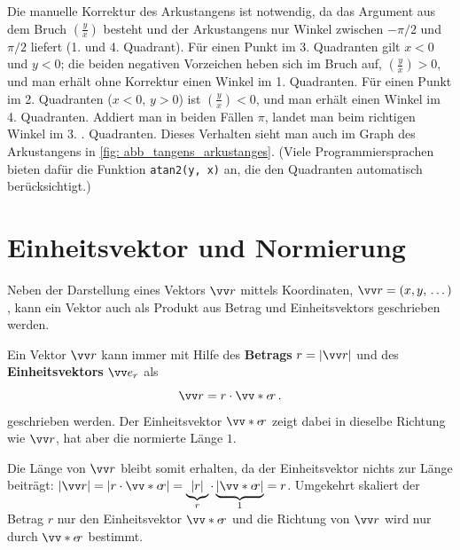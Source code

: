Die manuelle Korrektur des Arkustangens ist notwendig, da das Argument aus dem Bruch $(\frac{y}{x})$ besteht und der Arkustangens nur Winkel zwischen $-\pi/2$ und $\pi/2$ liefert (1. und 4. Quadrant). Für einen Punkt im 3. Quadranten gilt $x < 0$ und $y < 0$; die beiden negativen Vorzeichen heben sich im Bruch auf, $(\frac{y}{x}) > 0$, und man erhält ohne Korrektur einen Winkel im 1. Quadranten. Für einen Punkt im 2. Quadranten ($x<0$, $y>0$) ist $(\frac{y}{x}) < 0$, und man erhält einen Winkel im 4. Quadranten. Addiert man in beiden Fällen $\pi$, landet man beim richtigen Winkel im 3. . Quadranten. Dieses Verhalten sieht man auch im Graph des Arkustangens in \cref{fig: abb_tangens_arkustanges}. (Viele Programmiersprachen bieten dafür die Funktion \texttt{atan2(y, x)} an, die den Quadranten automatisch berücksichtigt.)  


\section{Einheitsvektor und Normierung}\label{sec: Einheitsvektor_Normierung}
Neben der Darstellung eines Vektors $\ivec{r}$ mittels Koordinaten, $\ivec{r} = (x,y,\,\dots)$,  kann ein Vektor auch als Produkt aus Betrag und Einheitsvektors geschrieben werden. 
\begin{rememberbox}[]{}
    Ein Vektor $\ivec{r}$ kann immer mit Hilfe des \textbf{Betrags} $r = |\ivec{r}|$ und des \textbf{Einheitsvektors} $\ivec{e_r}$ als 
    \begin{equation}
        \ivec{r} = r \cdot \ivecS{e}{r} \mDot
    \end{equation}
    geschrieben werden. Der Einheitsvektor $\ivecS{e}{r}$ zeigt dabei in dieselbe Richtung wie $\ivec{r}$, hat aber die normierte Länge $1$.
\end{rememberbox}
 Die Länge von $\ivec{r}$ bleibt somit erhalten, da der Einheitsvektor nichts zur Länge beiträgt: $|\ivec{r}| = |r \cdot \ivecS{e}{r}| = \underbrace{|r|}_r \cdot \underbrace{|\ivecS{e}{r}|}_1 = r$. Umgekehrt skaliert der Betrag $r$ nur den Einheitsvektor $\ivecS{e}{r}$ und die Richtung von $\ivec{r}$ wird nur durch $\ivecS{e}{r}$ bestimmt.\newline
